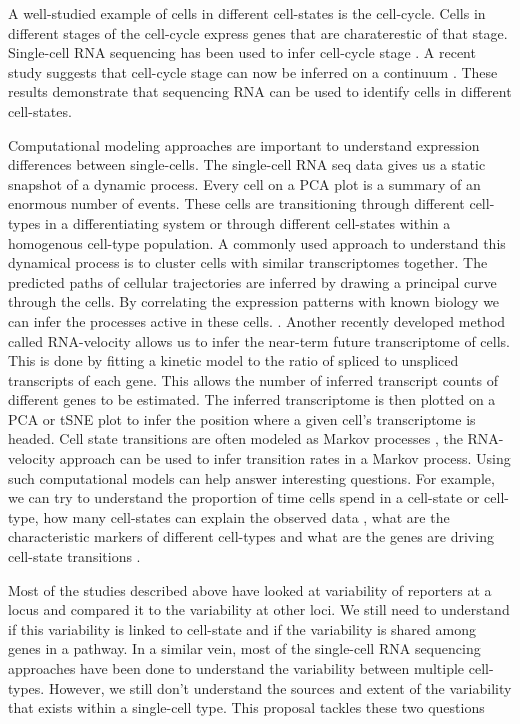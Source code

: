 A well-studied example of cells in different cell-states is the cell-cycle. Cells in different stages of the cell-cycle express genes that are charaterestic of that stage. Single-cell RNA sequencing has been used to infer cell-cycle stage \cite{buettner_computational_2015,leng_oscope_2015}. A recent study suggests that cell-cycle stage can now be inferred on a continuum  \cite{hsiao_characterizing_2019}. These results demonstrate that sequencing RNA can be used to identify cells in different cell-states.  \cite{trapnell_defining_2015,shaffer_memory_2018,sharma_chromatin-mediated_2010}

Computational modeling approaches are important to understand expression differences between single-cells. The single-cell RNA seq data gives us a static snapshot of a dynamic process. Every cell on a PCA plot is a summary of an enormous number of events. These cells are transitioning through different cell-types in a differentiating system or through different cell-states within a homogenous cell-type population. A commonly used approach to understand this dynamical process is to cluster cells with similar transcriptomes together. The predicted paths of cellular trajectories are inferred by drawing a principal curve through the cells. By correlating the expression patterns with known biology we can infer the processes active in these cells. \cite{trapnell_dynamics_2014}. Another recently developed method called RNA-velocity allows us to infer the near-term future transcriptome of cells. This is done by fitting a kinetic model to the ratio of spliced to unspliced transcripts of each gene. This allows the number of inferred transcript counts of different genes to be estimated. The inferred transcriptome is then plotted on a PCA or tSNE plot to infer the position where a given cell's transcriptome is headed.  \cite{manno_rna_2018} Cell state transitions are often modeled as Markov processes \cite{stumpf_stem_2017}, the RNA-velocity approach can be used to infer transition rates in a Markov process. Using such computational models can help answer interesting questions. For example, we can try to understand the proportion of time cells spend in a cell-state or cell-type, how many cell-states can explain the observed data  \cite{chang_transcriptome-wide_2008}, what are the characteristic markers of different cell-types and what are the genes are driving cell-state transitions \cite{furchtgott_discovering_2017}.

Most of the studies described above have looked at variability of reporters at a locus and compared it to the variability at other loci. We still need to understand if this variability is linked to cell-state and if the variability is shared among genes in a pathway. In a similar vein, most of the single-cell RNA sequencing approaches have been done to understand the variability between multiple cell-types. However, we still don't understand the sources and extent of the variability that exists within a single-cell type. This proposal tackles these two questions

